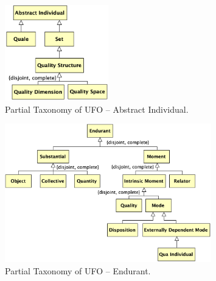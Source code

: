 \documentclass{article}
\newcommand{\BeginAbstractIndividualTaxonomy}{50}
\newcommand{\EndAbstractIndividualTaxonomy}{86}
\newcommand{\BeginEndurantTaxonomy}{88}
\newcommand{\EndEndurantTaxonomy}{144}
\begin{document}

\begin{figure}[ht]
    \centering
    \includegraphics[width=0.4\textwidth]{diagrams/Abstract_Individual_Diagram.png}
    \caption{Partial Taxonomy of UFO -- Abstract Individual.}
    \label{fig:ufo_taxonomy_abstract_individual}
\end{figure}




\begin{figure}[ht]
    \centering
    \includegraphics[width=0.8\textwidth]{diagrams/Endurant_Diagram.png}
    \caption{Partial Taxonomy of UFO -- Endurant.}
    \label{fig:ufo_taxonomy_endurant}
\end{figure}



\end{document}
